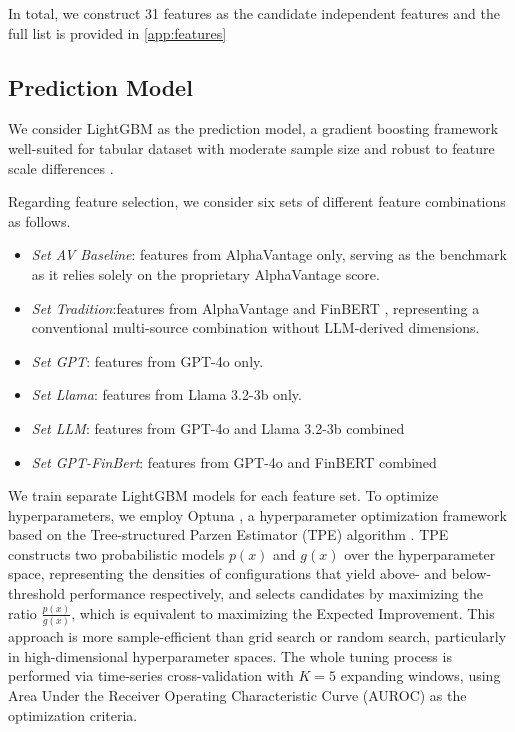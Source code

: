 \documentclass[preprint,12pt,authoryear]{elsarticle}
\newcommand{\gpt}{GPT-4o }
\newcommand{\llama}{Llama 3.2-3b }
\newcommand{\finbert}{FinBERT }
\begin{document}
In total, we construct 31 features as the candidate independent features and the full list is provided in  \ref{app:features}

\subsection{Prediction Model}
\label{SubsecModel}

We consider LightGBM \citep{ke2017lightgbm} as the prediction model, a gradient boosting framework well-suited for tabular dataset with moderate sample size and robust to feature scale differences \citep{grinsztajn2022tree,shwartz2022tabular}. 

Regarding feature selection, we consider six sets of different feature combinations as follows. 
\begin{itemize}
    \item \textit{Set AV Baseline}: features from AlphaVantage only, serving as the benchmark as it relies solely on the proprietary AlphaVantage score. 
    \item \textit{Set Tradition}:features from AlphaVantage and \finbert, representing a conventional multi-source combination without LLM-derived dimensions. 
    \item \textit{Set GPT}: features from \gpt only.
    \item \textit{Set Llama}: features from \llama only.
    \item \textit{Set LLM}: features from  \gpt and  \llama combined
    \item \textit{Set GPT-FinBert}: features from  \gpt and \finbert combined
\end{itemize}

We train separate LightGBM models for each feature set. To optimize  hyperparameters, we employ Optuna \citep{akiba2019optuna}, a hyperparameter optimization framework based on the Tree-structured Parzen Estimator (TPE) algorithm \citep{bergstra2011algorithms}. TPE constructs two probabilistic models $p(x)$ and $g(x)$ over the hyperparameter space, representing the densities of configurations that yield above- and below-threshold performance respectively, and selects candidates by maximizing the ratio $\frac{p(x)}{g(x)}$, which is equivalent to maximizing the Expected Improvement. This approach is more sample-efficient than grid search or random search, particularly in high-dimensional hyperparameter spaces. The whole tuning process is performed via time-series cross-validation with $K=5$ expanding windows, using Area Under the Receiver Operating Characteristic Curve (AUROC) as the optimization criteria. 
\end{document}
